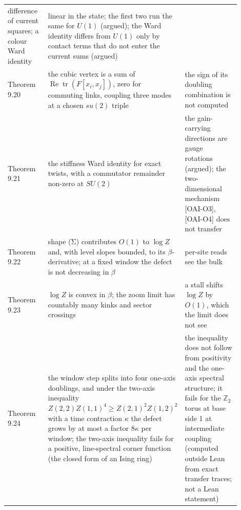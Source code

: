 \documentclass[10pt,letterpaper,twocolumn]{article}
\begin{document}
\begin{center}
{\begin{xtabular}{L{0.194\linewidth}L{0.414\linewidth}L{0.289\linewidth}}
difference of current squares; a colour Ward identity & linear in the state; the first two run the same for \(U(1)\) (argued);
the Ward identity differs from \(U(1)\) only by contact terms that do
not enter the current sums (argued) \\
Theorem 9.20 & the cubic vertex is a sum of
\(\operatorname{Re}\operatorname{tr}(F[x_i,x_j])\), zero for commuting
links, coupling three modes at a chosen \(su(2)\) triple & the sign of its doubling combination is not computed \\
Theorem 9.21 & the stiffness Ward identity for exact twists, with a commutator
remainder non-zero at \(SU(2)\) & the gain-carrying directions are gauge rotations (argued); the
two-dimensional mechanism {[}OAI-O3{]}, {[}OAI-O4{]} does not transfer \\
Theorem 9.22 & shape (Σ) contributes \(O(1)\) to \(\log Z\) and, with level slopes
bounded, to its \(\beta\)-derivative; at a fixed window the defect is
not decreasing in \(\beta\) & per-site reads see the bulk \\
Theorem 9.23 & \(\log Z\) is convex in \(\beta\); the zoom limit has countably many
kinks and sector crossings & a stall shifts \(\log Z\) by \(O(1)\), which the limit does not see \\
Theorem 9.24 & the window step splits into four one-axis doublings, and under the
two-axis inequality \(Z(2,2)Z(1,1)^4\ge Z(2,1)^2Z(1,2)^2\) with a time
contraction \(\kappa\) the defect grows by at most a factor \(8\kappa\)
per window; the two-axis inequality fails for a positive, line-spectral
corner function (the closed form of an Ising ring) & the inequality does not follow from positivity and the one-axis spectral
structure; it fails for the \(\mathbb Z_2\) torus at base side 1 at
intermediate coupling (computed outside Lean from exact transfer traces;
not a Lean statement) \\
\end{xtabular}
}
\end{center}
\end{document}
